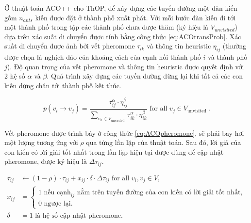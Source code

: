 Ở thuật toán ACO++ cho ThOP, để xây dựng các tuyến đường một đàn kiến gồm $n_{ants}$ kiến được đặt ở thành phố xuất phát. Với mỗi bước đàn kiến đi tới một thành phố trong tập các thành phố chưa được thăm (ký hiệu là $V_{unvisited}$) dựa trên xác suất di chuyển được tính bằng công thức \ref{eq:ACOtransProb}. Xác suất di chuyển được ảnh bởi vết pheromone $\tau_{i k}$ và thông tin heuristic $\eta_{i j}$ (thường được chọn là nghịch đảo của khoảng cách của cạnh nối thành phố $i$ và thành phố $j$). Độ quan trọng của vết pheromone và thông tin heuristic được quyết định với 2 hệ số $\alpha$ và $\beta$. Quá trình xây dựng các tuyến đường dừng lại khi tất cả các con kiến dừng chân tới thành phố kết thúc.

\begin{equation}\label{eq:ACOtransProb}
      p\left(v_i \rightarrow v_j\right)=\frac{\tau_{i j}^\alpha \cdot \eta_{i j}^\beta}{\sum_{v_k \in V_{\text {unvisited }}} \tau_{i k}^\alpha \cdot \eta_{i k}^\beta} \text { for all } v_j \in V_{\text {unvisited }}.
\end{equation}

Vết pheromone được trình bày ở công thức \ref{eq:ACOpheromone}, sẽ phải bay hơi một lượng tương ứng với $\rho$ qua từng lần lặp của thuật toán. Sau đó, lời giả của con kiến có lời giải tốt nhất trong lần lặp hiện tại được dùng để cập nhật pheromone, được ký hiệu là $\Delta\tau_{i j}$.

\begin{equation}\label{eq:ACOpheromone}
    \begin{split}
        \tau_{i j} &\gets (1-\rho)\cdot\tau_{i j}+x_{i j} \cdot \delta \cdot \Delta\tau_{i j} \text { for all } v_i, v_j \in V ,\\
        x_{i j} &=\left\{\begin{array}{l}1 \text { nếu } \text{cạnh}_{ij} \text { nằm trên tuyến đường của con kiến có lời giải tốt nhất, } \\ 0 \text { ngược lại. }\end{array}\right. \\
        \delta  &= 1 \text { là hệ số cập nhật pheromone. }
    \end{split}
\end{equation}

